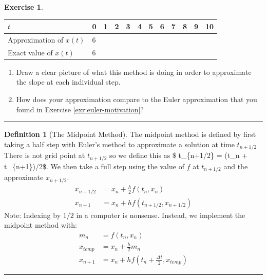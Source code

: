 \documentclass[
]{book}
\theoremstyle{definition}
\newtheorem{definition}{Definition}[chapter]
\theoremstyle{definition}
\theoremstyle{definition}
\newtheorem{exercise}{Exercise}[chapter]
\theoremstyle{remark}
\begin{document}
\begin{exercise}
\begin{longtable}[]{@{}llllllllllll@{}}
\toprule
\(t\) & 0 & 1 & 2 & 3 & 4 & 5 & 6 & 7 & 8 & 9 & 10\tabularnewline
\midrule
\endhead
Approximation of \(x(t)\) & 6 & & & & & & & & & &\tabularnewline
Exact value of \(x(t)\) & 6 & & & & & & & & & &\tabularnewline
\bottomrule
\end{longtable}

\begin{enumerate}
\def\labelenumi{\alph{enumi}.}
\setcounter{enumi}{2}
\item
  Draw a clear picture of what this method is doing in order to approximate the slope at each individual step.
\item
  How does your approximation compare to the Euler approximation that you found in Exercise \ref{exr:euler-motivation}?
\end{enumerate}
\end{exercise}

\begin{center}\rule{0.5\linewidth}{0.5pt}\end{center}

\begin{definition}[The Midpoint Method]
\protect\hypertarget{def:midpoint}{}{\label{def:midpoint} {} }The midpoint method is defined by first taking a half step with Euler's method to approximate a solution at time \(t_{n+1/2}\) There is not grid point at \(t_{n+1/2}\) so we define this as \$ t\_\{n+1/2\} = (t\_n + t\_\{n+1\})/2\$. We then take a full step using the value of \(f\) at \(t_{n+1/2}\) and the approximate \(x_{n+1/2}\).
\[\begin{aligned}
        x_{n+1/2} &= x_n + \frac{h}{2} f(t_n,x_n) \\
        x_{n+1} &= x_n + h f(t_{n+1/2},x_{n+1/2})
    \end{aligned}\]
Note: Indexing by \(1/2\) in a computer is nonsense. Instead, we implement the midpoint method with: \[\begin{aligned}
        m_n &= f(t_n,x_n) \\
        x_{temp} &= x_n + \frac{h}{2} m_n \\
        x_{n+1} &= x_n + h f\left( t_n + \frac{\Delta t}{2}, x_{temp}\right)
    \end{aligned}\]
\end{definition}

\begin{center}\rule{0.5\linewidth}{0.5pt}\end{center}
\end{document}

